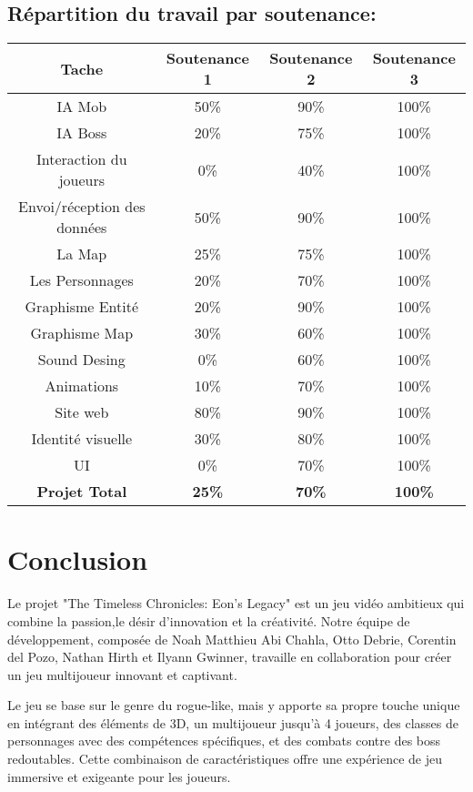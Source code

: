 \documentclass{article}
\begin{document}
\subsection*{Répartition du travail par soutenance:}
\begin{tabular}{|c|c|c|c|}\hline
    \textbf{Tache} & \textbf{Soutenance 1} & \textbf{Soutenance 2} & \textbf{Soutenance 3} \\ \hline
    IA Mob & 50\% & 90\% & 100\% \\ \hline
    IA Boss & 20\% & 75\% & 100\% \\ \hline
    Interaction du joueurs & 0\% & 40\% & 100\% \\ \hline
    Envoi/réception des données & 50\% & 90\% & 100\% \\ \hline
    La Map & 25\% & 75\% & 100\% \\ \hline
    Les Personnages & 20\% & 70\% & 100\% \\ \hline
    Graphisme Entité & 20\% & 90\% & 100\% \\ \hline
    Graphisme Map & 30\% & 60\% & 100\% \\ \hline
    Sound Desing & 0\% & 60\% & 100\% \\ \hline
    Animations & 10\% & 70\% & 100\% \\ \hline
    Site web & 80\% & 90\% & 100\% \\ \hline
    Identité visuelle & 30\% & 80\% & 100\% \\ \hline
    UI & 0\% & 70\% & 100\% \\ \hline \hline
    \textbf{Projet Total} & \textbf{25\%} & \textbf{70\%} & \textbf{100\%} \\ \hline
\end{tabular}

\section{Conclusion}
Le projet "The Timeless Chronicles: Eon's Legacy" est un jeu vidéo ambitieux qui combine la passion,le désir d'innovation et la créativité. Notre équipe de développement, composée de Noah Matthieu Abi Chahla, Otto Debrie, Corentin del Pozo, Nathan Hirth et Ilyann Gwinner, travaille en collaboration pour créer un jeu multijoueur innovant et captivant.

Le jeu se base sur le genre du rogue-like, mais y apporte sa propre touche unique en intégrant des éléments de 3D, un multijoueur jusqu'à 4 joueurs, des classes de personnages avec des compétences spécifiques, et des combats contre des boss redoutables. Cette combinaison de caractéristiques offre une expérience de jeu immersive et exigeante pour les joueurs.
\end{document}
